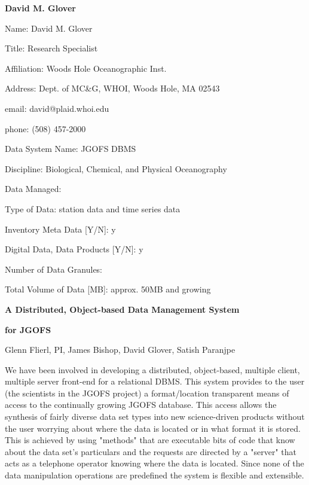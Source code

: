 \begin{center}
\LARGE
{\bf  David M. Glover}
\end{center}
\large
{}
\normalsize
\smallskip
\begin{description}
\item{Name:}  David M. Glover
\item{Title:}  Research Specialist
\item{Affiliation:}  Woods Hole Oceanographic Inst.
\item{Address:}  Dept. of MC\&G, WHOI, Woods Hole, MA 02543
\item{email:}  david@plaid.whoi.edu
\item{phone:}  (508) 457-2000
\end{description}
\medskip
\large
{}
\normalsize
\medskip
\begin{description}

\item{Data System Name:}  JGOFS DBMS
\item{Discipline:}  Biological, Chemical, and Physical Oceanography
\item{Data Managed:}
	\begin{description}
	\item{Type of Data:}  station data and time series data
	\item{Inventory Meta Data [Y/N]:}  y
	\item{Digital Data, Data Products [Y/N]:}  y
	\item{Number of Data Granules:}
	\item{Total Volume of Data [MB]:}  approx. 50MB and growing
	\end{description}
\end{description}

\medskip
\large
{}
\medskip

\centerline{\bf A Distributed, Object-based Data Management System}
\centerline {\bf for JGOFS}
\centerline{Glenn Flierl, PI, James Bishop, David Glover, Satish Paranjpe}
\normalsize
\medskip
	We have been involved in developing a distributed, object-based, 
multiple client, multiple server front-end for a relational DBMS.  This 
system provides to the user (the scientists in the JGOFS project) a 
format/location transparent means of access to the continually growing 
JGOFS database. This access allows the synthesis of fairly diverse data 
set types into new science-driven products without the user worrying 
about where the data is located or in what format it is stored. This is 
achieved by using "methods" that are executable bits of code that know 
about the data set's particulars and the requests are directed by a "server" 
that acts as a telephone operator knowing where the data is located. Since 
none of the data manipulation operations are predefined the system is 
flexible and extensible.

